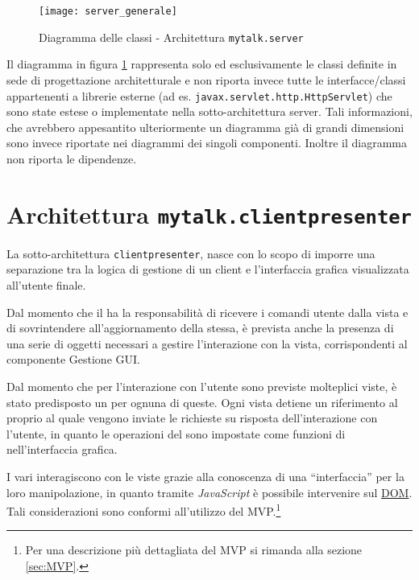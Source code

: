 \begin{figure}[H]
  \centering
  \texttt{[image: server\_generale]}
  \caption{Diagramma delle classi - Architettura \texttt{mytalk.server}}\label{fig:sottoarchserver}
\end{figure}

Il diagramma in figura \ref{fig:sottoarchserver} rappresenta solo ed esclusivamente le classi definite in sede di progettazione architetturale e non riporta invece tutte le interfacce/classi appartenenti a librerie esterne (ad es. \texttt{javax.servlet.http.HttpServlet}) che sono state estese o implementate nella sotto-architettura server. Tali informazioni, che avrebbero appesantito ulteriormente un diagramma già di grandi dimensioni sono invece riportate nei diagrammi dei singoli componenti.
Inoltre il diagramma non riporta le dipendenze.
\clearpage


\section{Architettura \texttt{mytalk.clientpresenter}}\label{sec:clientpresenter}
La sotto-architettura \texttt{clientpresenter}, nasce con lo scopo di imporre una separazione tra la logica di gestione di un client e l'interfaccia grafica visualizzata all'utente finale.

Dal momento che il  ha la responsabilità di ricevere i comandi utente dalla vista e di sovrintendere all'aggiornamento della stessa, è prevista anche la presenza di una serie di oggetti necessari a gestire l'interazione con la vista, corrispondenti al componente \textsf{Gestione GUI}\@.

Dal momento che per l'interazione con l'utente sono previste molteplici viste, è stato predisposto un  per ognuna di queste. Ogni vista detiene un riferimento al proprio  al quale vengono inviate le richieste su risposta dell'interazione con l'utente, in quanto le operazioni del  sono impostate come funzioni di  nell'interfaccia grafica.

I vari  interagiscono con le viste grazie alla conoscenza di una ``interfaccia'' per la loro manipolazione, in quanto tramite \textit{JavaScript} è possibile intervenire sul \underline{DOM}\@. Tali considerazioni sono conformi all'utilizzo del  MVP.\footnote{%
  Per una descrizione più dettagliata del  MVP si rimanda alla sezione \ref{sec:MVP}\@.
}

